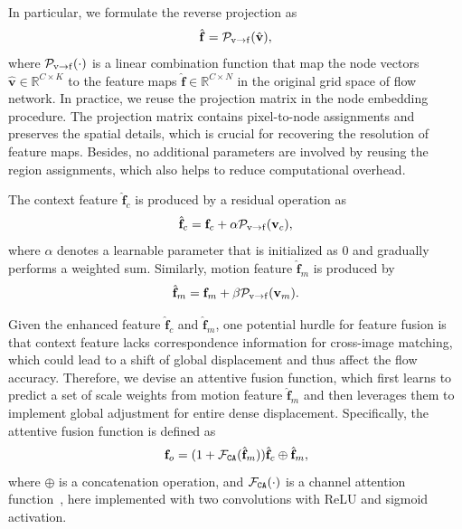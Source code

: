 \documentclass[letterpaper]{article} %
\begin{document}
In particular, we formulate the reverse projection as
\begin{equation}
	\hat{\mathbf f} = {\cal P}_{{\mathrm v}\rightarrow {\mathrm f}}(\hat{\mathbf v}),
\end{equation}
where ${\cal P}_{{\mathrm v}\rightarrow {\mathrm f}}(\cdot)$ is a linear combination function that map the node vectors $\hat{\mathbf v} \in \mathbb{R}^{C \times K}$ to the feature maps $\hat{\mathbf f} \in \mathbb{R}^{C \times N}$ in the original grid space of flow network. In practice, we reuse the projection matrix in the node embedding procedure. The projection matrix contains pixel-to-node assignments and preserves the spatial details, which is crucial for recovering the resolution of feature maps. Besides, no additional parameters are involved by reusing the region assignments, which also helps to reduce computational overhead.

The context feature $\hat{\mathbf f}_c$ is produced by a residual operation as
\begin{equation}
	\hat{\mathbf f}_c = {\mathbf f}_c + \alpha {\cal P}_{{\mathrm v}\rightarrow {\mathrm f}}({\mathbf v}_c),
\end{equation}
where $\alpha$ denotes a learnable parameter that is initialized as $0$ and gradually performs a weighted sum. Similarly, motion feature $\hat{\mathbf f}_m$ is produced by
\begin{equation}
	\hat{\mathbf f}_m = {\mathbf f}_m + \beta {\cal P}_{{\mathrm v}\rightarrow {\mathrm f}}({\mathbf v}_m).
\end{equation}

Given the enhanced feature $\hat{\mathbf f}_c$ and $\hat{\mathbf f}_m$, one potential hurdle for feature fusion is that context feature lacks correspondence information for cross-image matching, which could lead to a shift of global displacement and thus affect the flow accuracy. Therefore, we devise an attentive fusion function, which first learns to predict a set of scale weights from motion feature $\hat{\mathbf f}_m$ and then leverages them to implement global adjustment for entire dense displacement. Specifically, the attentive fusion function is defined as
\begin{equation}
	{\mathbf f}_o = (1+{\cal F}_{\tt CA}(\hat{\mathbf f}_m)) \hat{\mathbf f}_c \oplus \hat{\mathbf f}_m,
\end{equation}
where $\oplus$ is a concatenation operation, and ${\cal F}_{\tt CA}(\cdot)$ is a channel attention function~\cite{Hu2020SqueezeandExcitationN}, here implemented with two convolutions with ReLU and sigmoid activation.
\end{document}
